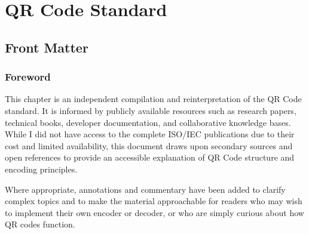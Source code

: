 \documentclass[../../1_thesis]{subfiles}
\begin{document}
\chapter{QR Code Standard}

\section{Front Matter}

\subsection{Foreword}




This chapter is an independent compilation and reinterpretation of the QR Code standard. 
It is informed by publicly available resources such as research papers, technical books, developer documentation, and collaborative knowledge bases. 
While I did not have access to the complete ISO/IEC publications due to their cost and limited availability, this document draws upon secondary sources and open references to provide an accessible explanation of QR Code structure and encoding principles.  

Where appropriate, annotations and commentary have been added to clarify complex topics and to make the material approachable for readers who may wish to implement their own encoder or decoder, or who are simply curious about how QR codes function.  
\end{document}
